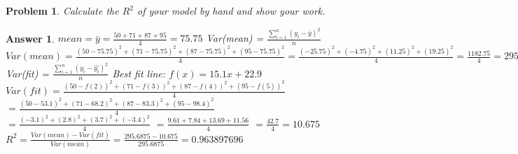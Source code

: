 \documentclass[11pt]{article}
\theoremstyle{description}
\newtheorem{problem}{Problem}
\theoremstyle{break}
\newtheorem*{answer}{Answer}
\begin{document}
    \begin{problem}
        Calculate the $R^2$ of your model by hand and show your work.
    \end{problem}
    \begin{answer}
        $mean = \bar{y} = \frac{50 + 71 + 87 + 95}{4} = 75.75$\newline
        Var(mean) = $\frac{\sum_{i=1}^{n} (y_i - \bar{y})^2}{n}$\newline
        $Var(mean) = \frac{(50 - 75.75)^2 + (71 - 75.75)^2 + (87 - 75.75)^2 + (95 - 75.75)^2}{4}
        = \frac{(-25.75)^2 + (-4.75)^2 + (11.25)^2 + (19.25)^2}{4}
        = \frac{1182.75}{4} = 295.6875$\newline
        Var(fit) = $\frac{\sum_{i=1}^{n} (y_i - \hat{y_i})^2}{n}$\newline
        Best fit line: $f(x) = 15.1x + 22.9$\newline
        $Var(fit) = \frac{(50 - f(2))^2 + (71 - f(3))^2 + (87 - f(4))^2 + (95 - f(5))^2}{4}$\newline
        $= \frac{(50 - 53.1)^2 + (71 - 68.2)^2 + (87 - 83.3)^2 + (95 - 98.4)^2}{4}$\newline
        $= \frac{(-3.1)^2 + (2.8)^2 + (3.7)^2 + (-3.4)^2}{4}$\newline
        $= \frac{9.61 + 7.84 + 13.69 + 11.56}{4}$\newline
        $= \frac{42.7}{4} = 10.675$\newline
        $R^2 = \frac{Var(mean) - Var(fit)}{Var(mean)} = \frac{295.6875 - 10.675}{295.6875} = 0.963897696$
    \end{answer}
\end{document}
